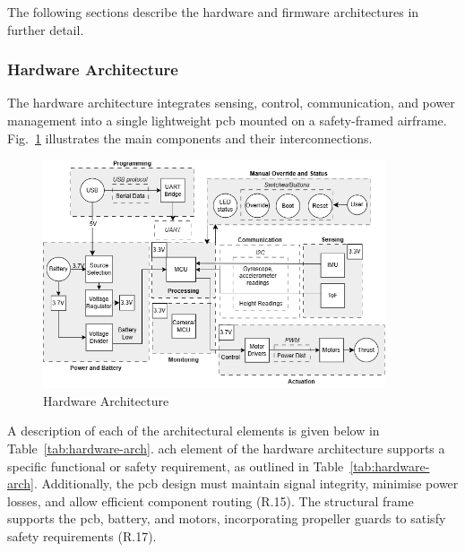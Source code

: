 The following sections describe the hardware and firmware architectures in further detail.

\subsubsection{Hardware Architecture}

The hardware architecture integrates sensing, control, communication, and power management into a single lightweight \gls{pcb} mounted on a safety-framed airframe. Fig.~\ref{fig:block-hardware} illustrates the main components and their interconnections. 

\begin{figure}[H]
    \centering
    \captionsetup{justification=centering, margin=1cm}
    \includegraphics[width=0.9\textwidth]{img/block-hardware-gray.PNG}
    \caption{Hardware Architecture}
    \label{fig:block-hardware}
\end{figure}

A description of each of the architectural elements is given below in Table~\ref{tab:hardware-arch}.  ach element of the hardware architecture supports a specific functional or safety requirement, as outlined in Table~\ref{tab:hardware-arch}. Additionally, the \gls{pcb} design must maintain signal integrity, minimise power losses, and allow efficient component routing (R.15). The structural frame supports the \gls{pcb}, battery, and motors, incorporating propeller guards to satisfy safety requirements (R.17).

